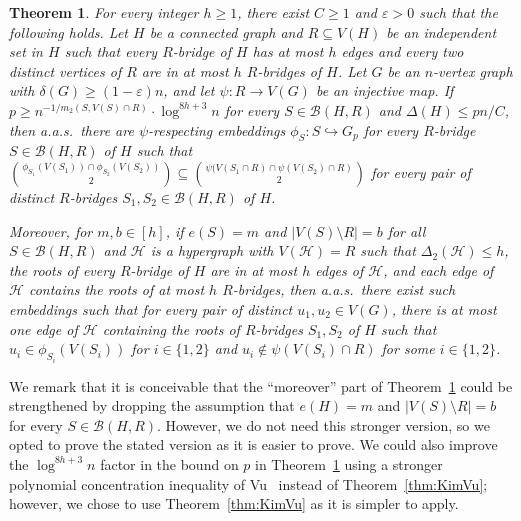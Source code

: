 \documentclass[11pt]{article}
\numberwithin{equation}{section}
\newcounter{i}
\theoremstyle{plain}
\newtheorem{thm}{Theorem}[section]
\theoremstyle{plain} %
\theoremstyle{definition}
\newcommand{\cB}{\mathcal{B}}
\newcommand{\cH}{\mathcal{H}}
\newcommand{\aas}{a.a.s.\ }
\begin{document}
\begin{thm}\label{thm:Embed}
For every integer $h\ge 1$, there exist $C\ge 1$ and $\varepsilon > 0$ such that the following holds.  Let $H$ be a connected graph and $R\subseteq V(H)$ be an independent set in $H$ such that every $R$-bridge of $H$ has at most $h$ edges and every two distinct vertices of $R$ are in at most $h$ $R$-bridges of $H$. Let $G$ be an $n$-vertex graph with $\delta(G) \ge (1-\varepsilon)n$, and let $\psi : R \rightarrow V(G)$ be an injective map.
If $p \geq n^{-1/m_2(S,V(S)\cap R)} \cdot \log^{8h+3} n$ for every $S \in \cB(H, R)$ and $\Delta(H)\le {pn}/{C}$, then \aas there are $\psi$-respecting embeddings $\phi_S : S \hookrightarrow G_p$ for every $R$-bridge $S \in \cB(H, R)$ of $H$ such that $\binom{\phi_{S_1}(V(S_1)) \cap \phi_{S_2}(V(S_2))}{2} \subseteq \binom{\psi(V(S_1 \cap R) \cap \psi(V(S_2) \cap R)}{2}$ for every pair of distinct $R$-bridges $S_1,S_2 \in \cB(H,R)$ of $H$.

Moreover, for $m,b\in [h]$, if $e(S) = m$ and $|V(S) \setminus R| = b$ for all $S \in \cB(H, R)$ and $\cH$ is a hypergraph with $V(\cH) = R$ such that $\Delta_2(\cH) \leq h$, the roots of every $R$-bridge of $H$ are in at most $h$ edges of $\cH$, and each edge of $\cH$ contains the roots of at most $h$ $R$-bridges, then
\aas there exist such embeddings such that for every pair of distinct $u_1,u_2\in V(G)$, there is at most one edge of $\cH$ containing the roots of $R$-bridges $S_1,S_2$ of $H$ such that $u_i \in \phi_{S_i}(V(S_i))$ for $i \in \{1,2\}$ and $u_i \notin \psi(V(S_i)\cap R)$ for some $i \in \{1,2\}$.

\end{thm}

We remark that  it is conceivable that the ``moreover'' part of Theorem~\ref{thm:Embed} could be strengthened by dropping the assumption that $e(H) = m$ and $|V(S) \setminus R| = b$ for every $S \in \cB(H,R)$.  However, we do not need this stronger version, so we opted to prove the stated version as it is easier to prove.  
We could also improve the $\log^{8h+3}n$ factor in the bound on $p$ in Theorem~\ref{thm:Embed} using a stronger polynomial concentration inequality of Vu~\cite{V02} instead of Theorem~\ref{thm:KimVu}; however, we chose to use Theorem~\ref{thm:KimVu} as it is simpler to apply.
\end{document}
